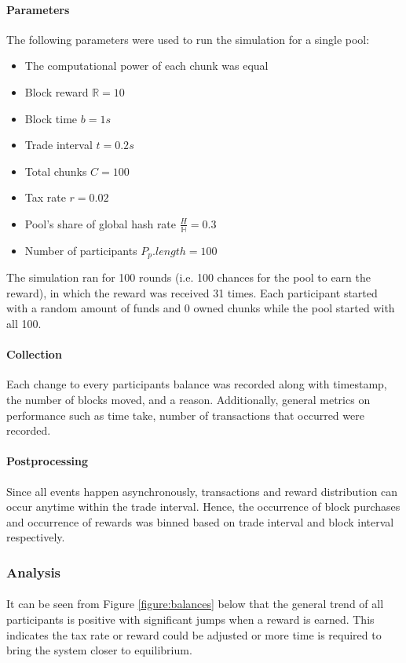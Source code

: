 \paragraph{Parameters} The following parameters were used to run the simulation for a single pool:

\begin{itemize}
  \item The computational power of each chunk was equal
  \item Block reward $\mathbb{R} = 10$
  \item Block time $b = 1s$
  \item Trade interval $t = 0.2s$
  \item Total chunks $C = 100$
  \item Tax rate $r = 0.02$
  \item Pool's share of global hash rate $\frac{H}{\mathbb{H}} = 0.3$
  \item Number of participants $P_p.length = 100$
\end{itemize}
The simulation ran for 100 rounds (i.e. 100 chances for the pool to earn the reward), in which the reward was received 31 times. Each participant started with a random amount of funds and 0 owned chunks while the pool started with all 100.

\paragraph{Collection} Each change to every participants balance was recorded along with timestamp, the number of blocks moved, and a reason. Additionally, general metrics on performance such as time take, number of transactions that occurred were recorded.

\paragraph{Postprocessing} Since all events happen asynchronously, transactions and reward distribution can occur anytime within the trade interval. Hence, the occurrence of block purchases and occurrence of rewards was binned based on trade interval and block interval respectively.

\subsubsection{Analysis}

\paragraph{} It can be seen from Figure \ref{figure:balances} below that the general trend of all participants is positive with significant jumps when a reward is earned. This indicates the tax rate or reward could be adjusted or more time is required to bring the system closer to equilibrium.

